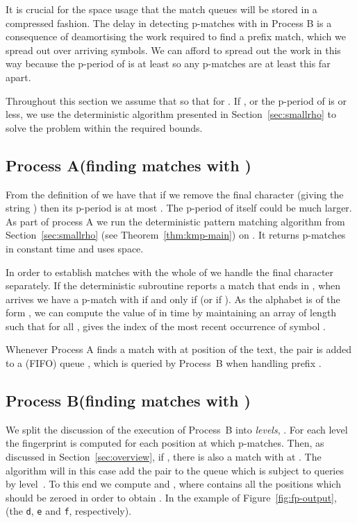 \documentclass[11pt,a4paper]{article}
\theoremstyle{theorem}
\newcommand{\pmatch}{\mbox{p-match}\xspace}
\newcommand{\pmatches}{\mbox{p-matches}\xspace}
\newcommand{\pperiod}{\mbox{p-period}\xspace}
\newcommand{\procA}{\textup{A}\xspace}
\newcommand{\procB}{\textup{B}\xspace}
\begin{document}
It is crucial for the space usage that the match queues  will be stored in a compressed fashion.  The delay in detecting \pmatches with  in Process \procB is a consequence of deamortising the work required to find a prefix match, which we spread out over  arriving symbols. We can afford to spread out the work in this way because the \pperiod of  is at least  so any \pmatches are at least this far apart.


Throughout this section we assume that  so that  for .
If , or the \pperiod of  is  or less, we use the deterministic algorithm presented in Section~\ref{sec:smallrho} to solve the problem within the required bounds.




\subsection{Process \procA (finding matches with )}

From the definition of  we have that if
we remove the final character (giving the string ) then its \pperiod is at most .
The \pperiod of  itself could be much larger.
As part of process \procA we run the deterministic pattern matching algorithm from Section~\ref{sec:smallrho} (see Theorem~\ref{thm:kmp-main}) on . It returns \pmatches in constant time and uses  space.

In order to establish matches with the whole of  we handle the final character separately.
If the deterministic subroutine reports a match that ends in , when  arrives we have a \pmatch with  if and only if  (or  if ). As the alphabet is of the form , we can compute the value of  in  time by maintaining an array  of length  such that for all ,  gives the index of the most recent occurrence of symbol .

Whenever Process \procA finds a match with  at position  of the text, the pair  is added to a (FIFO) queue , which is queried by Process~\procB when handling prefix .

\subsection{Process \procB (finding matches with )}







We split the discussion of the execution of Process~\procB into  \emph{levels}, .
For each level~ the fingerprint  is computed for each position  at which  \pmatches.
Then, as discussed in Section~\ref{sec:overview}, if , there is also a match with  at . The algorithm will in this case add the pair  to the queue  which is subject to queries by level~.
To this end we compute  and , where  contains all the positions which should be zeroed in order to obtain .
In the example of Figure~\ref{fig:fp-output},
 (the \texttt{d}, \texttt{e} and \texttt{f}, respectively).
\end{document}
